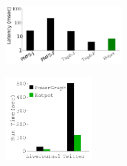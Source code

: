 {
\begin{figure}[th]
\begin{minipage}{1.75in}
\begin{center}
\centerline{\includegraphics[width=1.75in]{Figures/g_plot_YCSB_load_latency.pdf}}
{
}
\end{center}
\end{minipage}
\begin{minipage}{1.3in}
\begin{center}
\centerline{\includegraphics[width=1.3in]{Figures/g_plot_FAST_graph.pdf}}
{
}
\end{center}
\end{minipage}
\end{figure}
}
